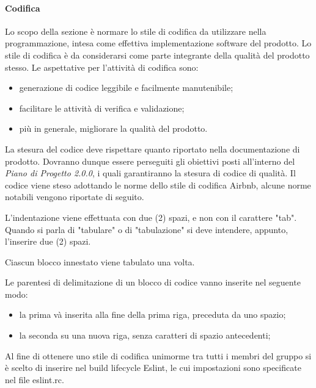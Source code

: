 		\paragraph{Codifica}
	    Lo scopo della sezione è normare lo stile di codifica da utilizzare nella programmazione, intesa come effettiva implementazione software del prodotto. Lo stile di codifica è da considerarsi come parte integrante della qualità del prodotto stesso.
	    Le aspettative per l'attività di codifica sono:
	    \begin{itemize}
	    	\item generazione di codice leggibile e facilmente manutenibile; 
	    	\item facilitare le attività di verifica e validazione;
	    	\item più in generale, migliorare la qualità del prodotto.
	    \end{itemize}
	    La stesura del codice deve rispettare quanto riportato nella documentazione di prodotto. Dovranno dunque essere perseguiti gli obiettivi posti all'interno del \textit{Piano di Progetto 2.0.0}, i quali garantiranno la stesura di codice di qualità. Il codice viene steso adottando le norme dello stile di codifica Airbnb, alcune norme notabili vengono riportate di seguito.
	    
	    L'indentazione viene effettuata con due (2) spazi, e non con il carattere "tab". Quando si parla di "tabulare" o di "tabulazione" si deve intendere, appunto, l'inserire due (2) spazi.
	    
	    Ciascun blocco innestato viene tabulato una volta.
	    
	    Le parentesi di delimitazione di un blocco di codice vanno inserite nel seguente modo:
	    \begin{itemize}
	        \item la prima và inserita alla fine della prima riga, preceduta da uno spazio;
	        \item la seconda su una nuova riga, senza caratteri di spazio antecedenti;
	    \end{itemize}

        Al fine di ottenere uno stile di codifica unimorme tra tutti i membri del gruppo si è scelto di inserire nel build lifecycle Eslint, le cui impostazioni sono specificate nel file eslint.rc.

